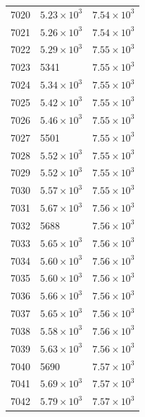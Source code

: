 \begin{table}[H]
\begin{tabular}{lll}
7020 & $\displaystyle 5.23 \times 10^{3}$ & $\displaystyle 7.54 \times 10^{3}$ \\
7021 & $\displaystyle 5.26 \times 10^{3}$ & $\displaystyle 7.54 \times 10^{3}$ \\
7022 & $\displaystyle 5.29 \times 10^{3}$ & $\displaystyle 7.55 \times 10^{3}$ \\
7023 & 5341 & $\displaystyle 7.55 \times 10^{3}$ \\
7024 & $\displaystyle 5.34 \times 10^{3}$ & $\displaystyle 7.55 \times 10^{3}$ \\
7025 & $\displaystyle 5.42 \times 10^{3}$ & $\displaystyle 7.55 \times 10^{3}$ \\
7026 & $\displaystyle 5.46 \times 10^{3}$ & $\displaystyle 7.55 \times 10^{3}$ \\
7027 & 5501 & $\displaystyle 7.55 \times 10^{3}$ \\
7028 & $\displaystyle 5.52 \times 10^{3}$ & $\displaystyle 7.55 \times 10^{3}$ \\
7029 & $\displaystyle 5.52 \times 10^{3}$ & $\displaystyle 7.55 \times 10^{3}$ \\
7030 & $\displaystyle 5.57 \times 10^{3}$ & $\displaystyle 7.55 \times 10^{3}$ \\
7031 & $\displaystyle 5.67 \times 10^{3}$ & $\displaystyle 7.56 \times 10^{3}$ \\
7032 & 5688 & $\displaystyle 7.56 \times 10^{3}$ \\
7033 & $\displaystyle 5.65 \times 10^{3}$ & $\displaystyle 7.56 \times 10^{3}$ \\
7034 & $\displaystyle 5.60 \times 10^{3}$ & $\displaystyle 7.56 \times 10^{3}$ \\
7035 & $\displaystyle 5.60 \times 10^{3}$ & $\displaystyle 7.56 \times 10^{3}$ \\
7036 & $\displaystyle 5.66 \times 10^{3}$ & $\displaystyle 7.56 \times 10^{3}$ \\
7037 & $\displaystyle 5.65 \times 10^{3}$ & $\displaystyle 7.56 \times 10^{3}$ \\
7038 & $\displaystyle 5.58 \times 10^{3}$ & $\displaystyle 7.56 \times 10^{3}$ \\
7039 & $\displaystyle 5.63 \times 10^{3}$ & $\displaystyle 7.56 \times 10^{3}$ \\
7040 & 5690 & $\displaystyle 7.57 \times 10^{3}$ \\
7041 & $\displaystyle 5.69 \times 10^{3}$ & $\displaystyle 7.57 \times 10^{3}$ \\
7042 & $\displaystyle 5.79 \times 10^{3}$ & $\displaystyle 7.57 \times 10^{3}$ \\

\end{tabular}
\end{table}

